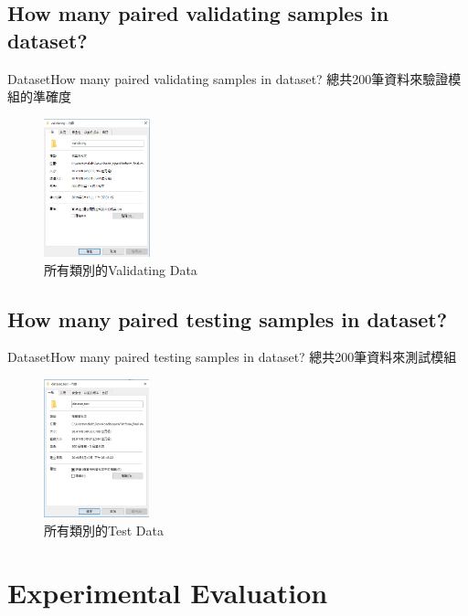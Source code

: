 \documentclass{beamer}
\begin{document}
\begin{CJK}{UTF8}{nkai}
\subsection{How many paired validating samples in dataset?}
\begin{frame}{Dataset}{How many paired validating samples in  dataset?}
總共200筆資料來驗證模組的準確度
\newline
\newline
\begin{figure}
\begin{center} 
\includegraphics[height=4cm]{7.png}
\end{center}
\caption{所有類別的Validating Data}
\end{figure}
\end{frame}
\subsection{How many paired testing samples in  dataset?}
\begin{frame}{Dataset}{How many paired testing samples in  dataset?}
總共200筆資料來測試模組
\newline
\newline
\begin{figure}
\begin{center} 
\includegraphics[height=4cm]{6.png}
\end{center}
\caption{所有類別的Test Data}
\end{figure}
\end{frame}

\section{Experimental Evaluation}

\end{CJK}
\end{document}

